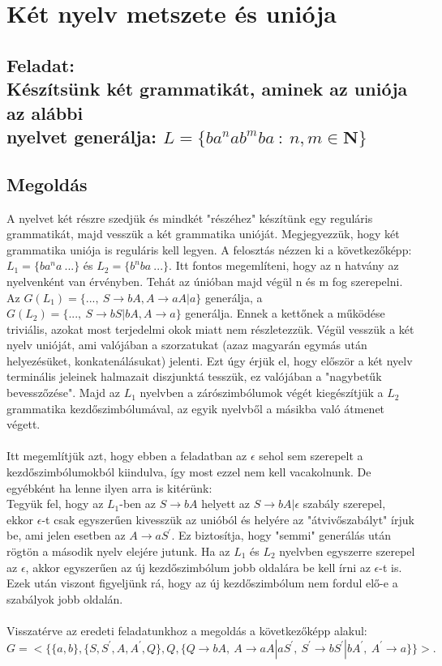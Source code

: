 \documentclass[12pt]{article}
\begin{document}
\section{Két nyelv metszete és uniója}
\subsection{Feladat: \\
Készítsünk két grammatikát, aminek az uniója az alábbi \\ nyelvet generálja:
$ L=\{ ba^{n}ab^{m}ba \ : \ n,m \in \mathbf{N} \} $}
\maketitle
\subsection{Megoldás}
A nyelvet két részre szedjük és mindkét "részéhez" készítünk egy reguláris grammatikát, majd vesszük a két
grammatika unióját. Megjegyezzük, hogy két grammatika uniója is reguláris kell legyen.
A felosztás nézzen ki a következőképp: $ L_{1}=\{ ba^{n}a \ ...\} $ és $ L_{2}=\{ b^{n}ba \ ...\} $.
Itt fontos megemlíteni, hogy az n hatvány az nyelvenként van érvényben. Tehát az únióban majd végül n és m
fog szerepelni.
Az $ G(L_{1})=\{ ..., \ S \rightarrow bA, A \rightarrow aA|a \} $ generálja, a
$ G(L_{2})=\{ ..., \ S \rightarrow bS|bA, A \rightarrow a \} $ generálja. Ennek a kettőnek a működése
triviális, azokat most terjedelmi okok miatt nem részletezzük. Végül vesszük a két nyelv unióját, ami
valójában a szorzatukat (azaz magyarán egymás után helyezésüket, konkatenálásukat) jelenti.
Ezt úgy érjük el, hogy először a két nyelv terminális jeleinek halmazait diszjunktá tesszük, ez valójában
a "nagybetűk bevesszőzése".
Majd az $L_{1}$ nyelvben a zárószimbólumok végét kiegészítjük a $L_{2}$ grammatika
kezdőszimbólumával, az egyik nyelvből a másikba való átmenet végett. \\\\
Itt megemlítjük azt, hogy ebben a feladatban az $\epsilon$ sehol sem szerepelt a kezdőszimbólumokból kiindulva,
így most ezzel nem kell vacakolnunk. De egyébként ha lenne ilyen arra is kitérünk: \\
Tegyük fel, hogy az $ L_{1} $-ben az $S \rightarrow bA$ helyett az $S \rightarrow bA|\epsilon$ 
szabály szerepel, ekkor $\epsilon$-t csak egyszerűen kivesszük az unióból és helyére az "átvivőszabályt" 
írjuk be, ami jelen esetben az $A \rightarrow aS^{'}$. Ez biztosítja, hogy "semmi" generálás után rögtön a
második nyelv elejére jutunk. Ha az $L_{1}$ és $L_{2}$ nyelvben egyszerre szerepel az $\epsilon$,
akkor egyszerűen az új kezdőszimbólum jobb oldalára be kell írni az $\epsilon$-t is.
Ezek után viszont figyeljünk rá, hogy az új kezdőszimbólum nem fordul elő-e a szabályok jobb oldalán. \\\\
Visszatérve az eredeti feladatunkhoz a megoldás a következőképp alakul: \\
$$ G=<\{ \{a,b\}, \{S,S^{'},A,A^{'},Q \}, Q, \{ Q \rightarrow bA, \ A \rightarrow aA|aS^{'}, \ S^{'} 
\rightarrow bS^{'}|bA^{'}, \ A^{'} \rightarrow a \} \}> . $$
\end{document}
